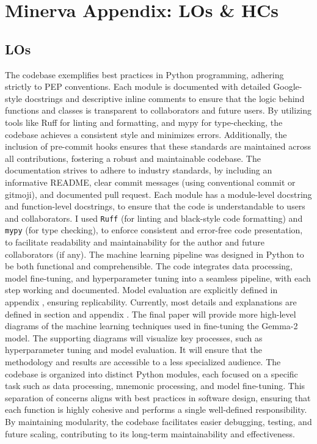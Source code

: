 \section{Minerva Appendix: LOs \& HCs} \label{sec:minerva}

\subsection{LOs} \label{sec:los}
 The codebase exemplifies best practices in Python programming, adhering strictly to PEP conventions. Each module is documented with detailed Google-style docstrings and descriptive inline comments to ensure that the logic behind functions and classes is transparent to collaborators and future users. By utilizing tools like Ruff for linting and formatting, and mypy for type-checking, the codebase achieves a consistent style and minimizes errors. Additionally, the inclusion of pre-commit hooks ensures that these standards are maintained across all contributions, fostering a robust and maintainable codebase.
 The documentation strives to adhere to industry standards, by including an informative README, clear commit messages (using conventional commit or gitmoji), and documented pull request. Each module has a module-level docstring and function-level docstrings, to ensure that the code is understandable to users and collaborators. I used \verb|Ruff| (for linting and black-style code formatting) and \verb|mypy| (for type checking), to enforce consistent and error-free code presentation, to facilitate readability and maintainability for the author and future collaborators (if any).
 The machine learning pipeline was designed in Python to be both functional and comprehensible. The code integrates data processing, model fine-tuning, and hyperparameter tuning into a seamless pipeline, with each step working and documented. Model evaluation are explicitly defined in appendix , ensuring replicability.
 Currently, most details and explanations are defined in section  and appendix . The final paper will provide more high-level diagrams of the machine learning techniques used in fine-tuning the Gemma-2 model. The supporting diagrams will visualize key processes, such as hyperparameter tuning and model evaluation. It will ensure that the methodology and results are accessible to a less specialized audience.
 The codebase is organized into distinct Python modules, each focused on a specific task such as data processing, mnemonic processing, and model fine-tuning. This separation of concerns aligns with best practices in software design, ensuring that each function is highly cohesive and performs a single well-defined responsibility. By maintaining modularity, the codebase facilitates easier debugging, testing, and future scaling, contributing to its long-term maintainability and effectiveness.

